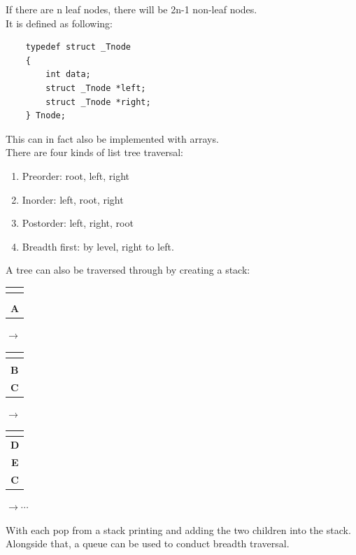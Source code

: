 \documentclass[nobib]{tufte-handout}
\begin{document}
If there are n leaf nodes, there will be 2n-1 non-leaf nodes.\\
It is defined as following:\\
\begin{lstlisting}
    typedef struct _Tnode
    {
        int data;
        struct _Tnode *left;
        struct _Tnode *right;
    } Tnode;
\end{lstlisting}
This can in fact also be implemented with arrays.\\ There are four kinds of
list tree traversal:
\begin{enumerate}
    \item Preorder: root, left, right
    \item Inorder: left, root, right
    \item Postorder: left, right, root
    \item Breadth first: by level, right to left.
\end{enumerate}
A tree can also be traversed through by creating a stack:\\
\begin{table}
    \centering
    \begin{tabular}[b]{|c|}
        \hline
        \textbf{}  \\
        \hline
        \textbf{}  \\
        \hline
        \textbf{}  \\
        \hline
        \textbf{A} \\
        \hline
    \end{tabular}
    $\rightarrow$
    \begin{tabular}[b]{|c|}
        \hline
        \textbf{}  \\
        \hline
        \textbf{}  \\
        \hline
        \textbf{B} \\
        \hline
        \textbf{C} \\
        \hline
    \end{tabular}
    $\rightarrow$
    \begin{tabular}[b]{|c|}
        \hline
        \textbf{}  \\
        \hline
        \textbf{D} \\
        \hline
        \textbf{E} \\
        \hline
        \textbf{C} \\
        \hline
    \end{tabular}
    $\rightarrow \cdots$
\end{table}
With each pop from a stack printing and adding the two children into the stack.\\
Alongside that, a queue can be used to conduct breadth traversal.\\
\end{document}
